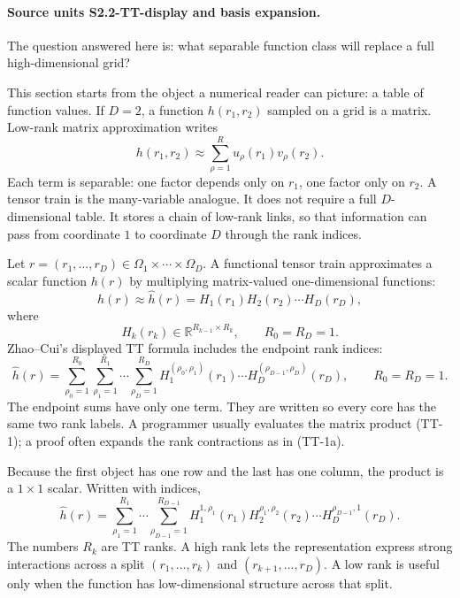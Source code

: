 \documentclass[11pt]{article}
\newcommand{\R}{\mathbb R}
\begin{document}
\paragraph{Source units S2.2-TT-display and basis expansion.}
The question answered here is: what separable function class will replace a
full high-dimensional grid?

This section starts from the object a numerical reader can picture: a table of
function values.  If \(D=2\), a function \(h(r_1,r_2)\) sampled on a grid is a
matrix.  Low-rank matrix approximation writes
\[
    h(r_1,r_2)\approx \sum_{\rho=1}^{R} u_\rho(r_1)v_\rho(r_2).
\]
Each term is separable: one factor depends only on \(r_1\), one factor only on
\(r_2\).  A tensor train is the many-variable analogue.  It does not require a
full \(D\)-dimensional table.  It stores a chain of low-rank links, so that
information can pass from coordinate \(1\) to coordinate \(D\) through the rank
indices.

Let \(r=(r_1,\ldots,r_D)\in\Omega_1\times\cdots\times\Omega_D\).  A functional
tensor train approximates a scalar function \(h(r)\) by multiplying
matrix-valued one-dimensional functions:
\[
    h(r)
    \approx
    \widehat h(r)
    =
    H_1(r_1)H_2(r_2)\cdots H_D(r_D),
    \tag{TT-1}
\]
where
\[
    H_k(r_k)\in \R^{R_{k-1}\times R_k},\qquad R_0=R_D=1.
\]
Zhao--Cui's displayed TT formula includes the endpoint rank indices:
\[
    \widehat h(r)
    =
    \sum_{\rho_0=1}^{R_0}\sum_{\rho_1=1}^{R_1}\cdots
    \sum_{\rho_D=1}^{R_D}
    H_1^{(\rho_0,\rho_1)}(r_1)\cdots
    H_D^{(\rho_{D-1},\rho_D)}(r_D),
    \qquad R_0=R_D=1.
    \tag{TT-1a}
\]
The endpoint sums have only one term.  They are written so every core has the
same two rank labels.  A programmer usually evaluates the matrix product
(TT-1); a proof often expands the rank contractions as in (TT-1a).

Because the first object has one row and the last has one column, the product is
a \(1\times 1\) scalar.  Written with indices,
\[
    \widehat h(r)
    =
    \sum_{\rho_1=1}^{R_1}\cdots
    \sum_{\rho_{D-1}=1}^{R_{D-1}}
    H_1^{1,\rho_1}(r_1)
    H_2^{\rho_1,\rho_2}(r_2)\cdots
    H_D^{\rho_{D-1},1}(r_D).
    \tag{TT-2}
\]
The numbers \(R_k\) are TT ranks.  A high rank lets the representation express
strong interactions across a split \((r_1,\ldots,r_k)\) and
\((r_{k+1},\ldots,r_D)\).  A low rank is useful only when the function has
low-dimensional structure across that split.
\end{document}
